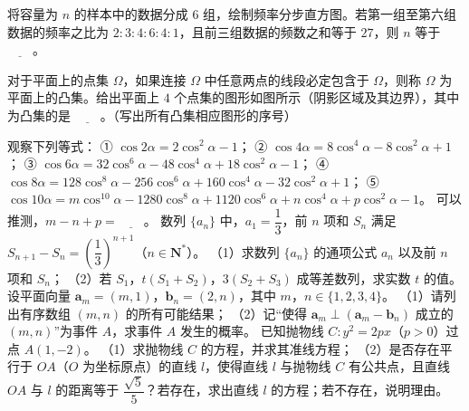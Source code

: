 \begin{question}
将容量为 $n$ 的样本中的数据分成 $6$ 组，绘制频率分步直方图。若第一组至第六组数据的频率之比为 $2:3:4:6:4:1$，且前三组数据的频数之和等于 $27$，则 $n$ 等于 $\underline{\qquad}$。
\Needspace{0.4\textheight}
\end{question}
\begingroup
\renewenvironment{question}{\Needspace{0.5\textheight}}{}
\begin{question}
对于平面上的点集 $\Omega$，如果连接 $\Omega$ 中任意两点的线段必定包含于 $\Omega$，则称 $\Omega$ 为平面上的凸集。给出平面上 $4$ 个点集的图形如图所示（阴影区域及其边界），其中为凸集的是 $\underline{\qquad}$。（写出所有凸集相应图形的序号）
\nopagebreak[4]
\begin{center}\end{center}
\nopagebreak[4]
\end{question}
\endgroup
\begin{question}
观察下列等式：
① $\cos2\alpha=2\cos^2\alpha-1$；
② $\cos4\alpha=8\cos^4\alpha-8\cos^2\alpha+1$；
③ $\cos6\alpha=32\cos^6\alpha-48\cos^4\alpha+18\cos^2\alpha-1$；
④ $\cos8\alpha=128\cos^8\alpha-256\cos^6\alpha+160\cos^4\alpha-32\cos^2\alpha+1$；
⑤ $\cos10\alpha=m\cos^{10}\alpha-1280\cos^8\alpha+1120\cos^6\alpha+n\cos^4\alpha+p\cos^2\alpha-1$。
可以推测，$m-n+p=\underline{\qquad}$。
\end{question}
\begin{question}
数列 $\{a_n\}$ 中，$a_1=\dfrac13$，前 $n$ 项和 $S_n$ 满足 $S_{n+1}-S_n=\left(\dfrac13\right)^{n+1}$（$n\in\mathbf N^*$）。
（1）求数列 $\{a_n\}$ 的通项公式 $a_n$ 以及前 $n$ 项和 $S_n$；
（2）若 $S_1$，$t(S_1+S_2)$，$3(S_2+S_3)$ 成等差数列，求实数 $t$ 的值。
\end{question}
\begin{question}
设平面向量 $\boldsymbol a_m=(m,1)$，$\boldsymbol b_n=(2,n)$，其中 $m$，$n\in\{1,2,3,4\}$。
（1）请列出有序数组 $(m,n)$ 的所有可能结果；
（2）记“使得 $\boldsymbol a_m\perp(\boldsymbol a_m-\boldsymbol b_n)$ 成立的 $(m,n)$”为事件 $A$，求事件 $A$ 发生的概率。
\end{question}
\begin{question}
已知抛物线 $C\colon y^2=2px$（$p>0$）过点 $A(1,-2)$。
（1）求抛物线 $C$ 的方程，并求其准线方程；
（2）是否存在平行于 $OA$（$O$ 为坐标原点）的直线 $l$，使得直线 $l$ 与抛物线 $C$ 有公共点，且直线 $OA$ 与 $l$ 的距离等于 $\dfrac{\sqrt5}{5}$？若存在，求出直线 $l$ 的方程；若不存在，说明理由。
\Needspace{0.4\textheight}
\end{question}
